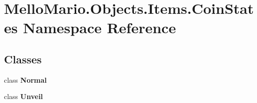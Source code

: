 \section{Mello\+Mario.\+Objects.\+Items.\+Coin\+States Namespace Reference}
\label{namespaceMelloMario_1_1Objects_1_1Items_1_1CoinStates}
\subsection*{Classes}
\begin{DoxyCompactItemize}
\item 
class \textbf{ Normal}
\item 
class \textbf{ Unveil}
\end{DoxyCompactItemize}

